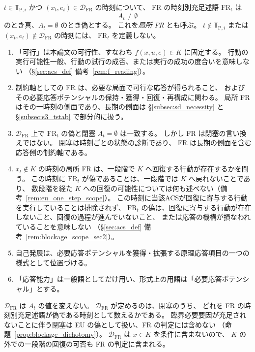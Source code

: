 \begin{definition}[FR の時刻別充足述語（局所 FR）]
\label{def:FR}
$t\in\mathbb{T}_{\mathrm{P},i}$ かつ $(x_t,e_t)\in\mathcal{D}_{\mathrm{FR}}$ の時刻について、
FR の時刻別充足述語 $\mathrm{FR}_t$ は
\[
  A_t\neq\emptyset
\]
のとき真、$A_t=\emptyset$ のとき偽とする。
これを\emph{局所 FR} とも呼ぶ。
$t\notin\mathbb{T}_{\mathrm{P},i}$ または $(x_t,e_t)\notin\mathcal{D}_{\mathrm{FR}}$ の時刻には、
$\mathrm{FR}_t$ を定義しない。
\end{definition}

\begin{remark}[FR の定義上の限定]
\label{rem:fr_scope}
\begin{enumerate}
  \item 「可行」は本論文の可行性、すなわち $f(x,u,e)\in K$ に固定する。
  行動の実行可能性一般、行動の試行の成否、または実行の成功の度合いを意味しない
  （\S\ref{sec:acs_def} 備考~\ref{rem:f_reading}）。
  \item 制約軸としての FR は、必要な局面で可行な応答が得られること、
  およびその必要応答ポテンシャルの保持・獲得・回復・再構成に関わる。
  局所 FR はその一時刻の側面であり、長期の側面は \S\ref{subsec:sd_necessity} と
  \S\ref{subsec:s3_tstab} で部分的に扱う。
  \item $\mathcal{D}_{\mathrm{FR}}$ 上で $\mathrm{FR}_t$ の偽と閉塞 $A_t=\emptyset$ は一致する。
  しかし FR は閉塞の言い換えではない。
  閉塞は時刻ごとの状態の診断であり、
  FR は長期の側面を含む応答側の制約軸である。
  \item $x_t\notin K$ の時刻の局所 FR は、一段階で $K$ へ回復する行動が存在するかを問う。
  この時刻に $\mathrm{FR}_t$ が偽であることは、一段階では $K$ へ戻れないことであり、
  数段階を経た $K$ への回復の可能性については何も述べない（備考~\ref{rem:eu_one_step_scope}）。
  この時刻に当該ACSが回復に寄与する行動を実行していることは排除されず、
  $\mathrm{FR}_t$ の偽は、回復に寄与する行動が存在しないこと、回復の過程が進んでいないこと、
  または応答の機構が損なわれていることを意味しない
  （\S\ref{sec:acs_def} 備考~\ref{rem:blockage_scope_sec2}）。
  \item 自己発展は、必要応答ポテンシャルを獲得・拡張する原理応答項目の一つの様式として位置づける。
  \item 「応答能力」は一般語としてだけ用い、形式上の用語は「必要応答ポテンシャル」とする。
\end{enumerate}
\end{remark}

\begin{remark}[定義域の役割]
\label{rem:fr_domain_role}
$\mathcal{D}_{\mathrm{FR}}$ は $A_t$ の値を変えない。
$\mathcal{D}_{\mathrm{FR}}$ が定めるのは、閉塞のうち、
どれを FR の時刻別充足述語が偽である時刻として数えるかである。
臨界必要要因が充足されないことに伴う閉塞は EU の偽として扱い、FR の判定には含めない
（命題~\ref{prop:blockage_dichotomy}）。
$\mathcal{D}_{\mathrm{FR}}$ は $x\in K$ を条件に含まないので、
$K$ の外での一段階の回復の可否も FR の判定に含まれる。
\end{remark}

